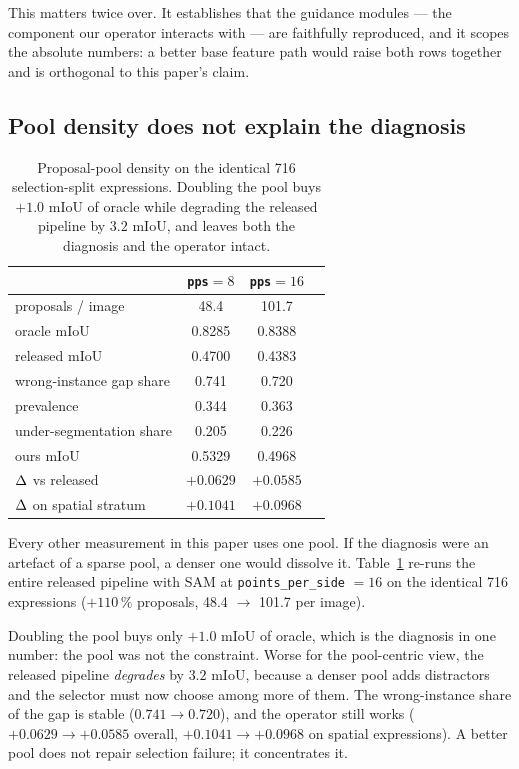 This matters twice over. It establishes that the guidance modules --- the
component our operator interacts with --- are faithfully reproduced, and it
scopes the absolute numbers: a better base feature path would raise both rows
together and is orthogonal to this paper's claim.

\subsection{Pool density does not explain the diagnosis}

\begin{table}[t]
\caption{Proposal-pool density on the identical 716 selection-split
expressions. Doubling the pool buys $+1.0$ mIoU of oracle while degrading the
released pipeline by $3.2$ mIoU, and leaves both the diagnosis and the operator
intact.}
\label{tab:pool}
\centering
\small
\begin{tabular}{lccc}
\toprule
& \texttt{pps}$=8$ & \texttt{pps}$=16$ \\
\midrule
proposals / image        & 48.4 & 101.7 \\
oracle mIoU              & 0.8285 & 0.8388 \\
released mIoU            & 0.4700 & 0.4383 \\
wrong-instance gap share & 0.741 & 0.720 \\
\;\;prevalence            & 0.344 & 0.363 \\
under-segmentation share & 0.205 & 0.226 \\
ours mIoU                & 0.5329 & 0.4968 \\
$\Delta$ vs released        & $+0.0629$ & $+0.0585$ \\
$\Delta$ on spatial stratum & $+0.1041$ & $+0.0968$ \\
\bottomrule
\end{tabular}
\end{table}

Every other measurement in this paper uses one pool. If the diagnosis were an
artefact of a sparse pool, a denser one would dissolve it. Table~\ref{tab:pool}
re-runs the entire released pipeline with SAM at \texttt{points\_per\_side}
$=16$ on the identical 716 expressions ($+110\,\%$ proposals, 48.4
$\rightarrow$ 101.7 per image).

Doubling the pool buys only $+1.0$ mIoU of oracle, which is the diagnosis in
one number: the pool was not the constraint. Worse for the pool-centric view,
the released pipeline \emph{degrades} by $3.2$ mIoU, because a denser pool adds
distractors and the selector must now choose among more of them. The
wrong-instance share of the gap is stable ($0.741 \rightarrow 0.720$), and the
operator still works ($+0.0629 \rightarrow +0.0585$ overall, $+0.1041
\rightarrow +0.0968$ on spatial expressions). A better pool does not repair
selection failure; it concentrates it.

